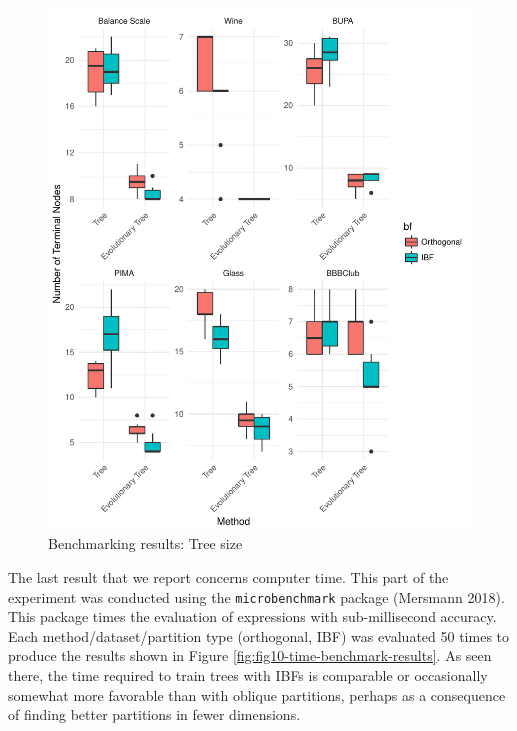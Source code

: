 \documentclass[]{elsarticle} %
\makeatletter
\def\maxwidth{\ifdim\Gin@nat@width>\linewidth\linewidth
\else\Gin@nat@width\fi}
\let\Oldincludegraphics\includegraphics
\renewcommand{\includegraphics}[1]{\Oldincludegraphics[width=\maxwidth]{#1}}
\makeatother
\begin{document}
\begin{figure}[htbp]
\centering
\includegraphics{Trees_with_Base_Functions_files/figure-latex/fig9-performance-benchmark-size-results-1.pdf}
\caption{\label{fig:fig9-performance-benchmark-size-results}Benchmarking
results: Tree size}
\end{figure}

The last result that we report concerns computer time. This part of the
experiment was conducted using the \texttt{microbenchmark} package
(Mersmann 2018). This package times the evaluation of expressions with
sub-millisecond accuracy. Each method/dataset/partition type
(orthogonal, IBF) was evaluated 50 times to produce the results shown in
Figure \ref{fig:fig10-time-benchmark-results}. As seen there, the time
required to train trees with IBFs is comparable or occasionally somewhat
more favorable than with oblique partitions, perhaps as a consequence of
finding better partitions in fewer dimensions.
\end{document}
